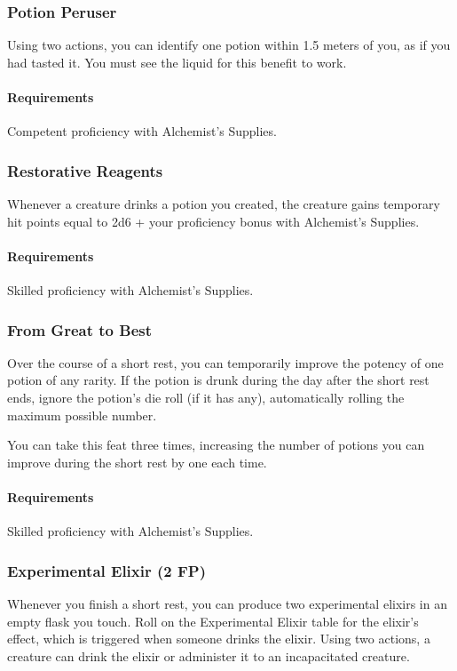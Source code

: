 \subsubsection{Potion Peruser} \label{feat::potionperuser}
    Using two actions, you can identify one potion within 1.5 meters of you, as if you had tasted it.
    You must see the liquid for this benefit to work.
    \paragraph{Requirements} Competent proficiency with Alchemist's Supplies.
\subsubsection{Restorative Reagents} \label{feat::restorativereagents}
    Whenever a creature drinks a potion you created, the creature gains temporary hit points equal to 2d6 + your proficiency bonus with Alchemist's Supplies.
    \paragraph{Requirements} Skilled proficiency with Alchemist's Supplies.
\subsubsection{From Great to Best} \label{feat::fromgreattobest}
    Over the course of a short rest, you can temporarily improve the potency of one potion of any rarity.
    If the potion is drunk during the day after the short rest ends, ignore the potion's die roll (if it has any), automatically rolling the maximum possible number.

    You can take this feat three times, increasing the number of potions you can improve during the short rest by one each time.
    \paragraph{Requirements} Skilled proficiency with Alchemist's Supplies.
\subsubsection{Experimental Elixir (2 FP)} \label{feat::experimentalelixir}
    Whenever you finish a short rest, you can produce two experimental elixirs in an empty flask you touch.
    Roll on the Experimental Elixir table for the elixir's effect, which is triggered when someone drinks the elixir.
    Using two actions, a creature can drink the elixir or administer it to an incapacitated creature.

